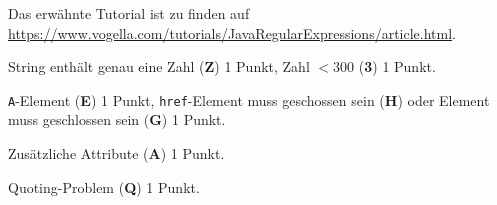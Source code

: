 \begin{diskussion}
Das erwähnte Tutorial ist zu finden auf
\url{https://www.vogella.com/tutorials/JavaRegularExpressions/article.html}.
\end{diskussion}

\begin{bewertung}
\begin{teilaufgaben}
\item String enthält genau eine Zahl ({\bf Z}) 1 Punkt,
Zahl $<300$ ({\bf 3}) 1 Punkt.
\item \texttt{A}-Element ({\bf E}) 1 Punkt,
\texttt{href}-Element muss geschossen sein ({\bf H}) oder 
Element muss geschlossen sein ({\bf G}) 1 Punkt.
\item Zusätzliche Attribute ({\bf A}) 1 Punkt.
\item Quoting-Problem ({\bf Q}) 1 Punkt.
\end{teilaufgaben}
\end{bewertung}

